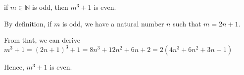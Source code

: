 if $m \in \mathbb{N}$ is odd, then $m^3 + 1$ is even.

By definition, if $m$ is odd, we have a natural number $n$ such that $m = 2n + 1$.

From that, we can derive $m^3 + 1 = (2n + 1)^3 + 1 = 8n ^ 3 + 12 n ^ 2 + 6 n + 2 = 2 (4n^3 + 6n^2 + 3n + 1)$

Hence, $m^3 + 1$ is even.